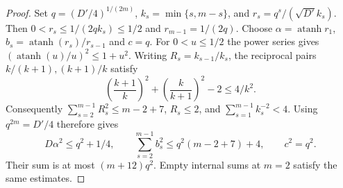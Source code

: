 \begin{proof}
Set $q=(D'/4)^{1/(2m)}$, $k_s=\min\{s,m-s\}$, and
$r_s=q^s/(\sqrt{D'}k_s)$. Then $0<r_s\le1/(2qk_s)\le1/2$ and
$r_{m-1}=1/(2q)$. Choose
$\alpha=\operatorname{atanh}r_1$,
$b_s=\operatorname{atanh}(r_s)/r_{s-1}$ and $c=q$.
For $0<u\le1/2$ the power series gives
$(\operatorname{atanh}(u)/u)^2\le1+u^2$.
Writing $R_s=k_{s-1}/k_s$, the reciprocal pairs
$k/(k+1),(k+1)/k$ satisfy
\[
 \left(\frac{k+1}{k}\right)^2+
 \left(\frac{k}{k+1}\right)^2-2\le4/k^2.
\]
Consequently $\sum_{s=2}^{m-1}R_s^2\le m-2+7$,
$R_s\le2$, and $\sum_{s=1}^{m-1}k_s^{-2}<4$.
Using $q^{2m}=D'/4$ therefore gives
\[
 D\alpha^2\le q^2+1/4,\qquad
 \sum_{s=2}^{m-1}b_s^2\le q^2(m-2+7)+4,\qquad c^2=q^2.
\]
Their sum is at most $(m+12)q^2$. Empty internal sums at $m=2$
satisfy the same estimates.
\end{proof}

